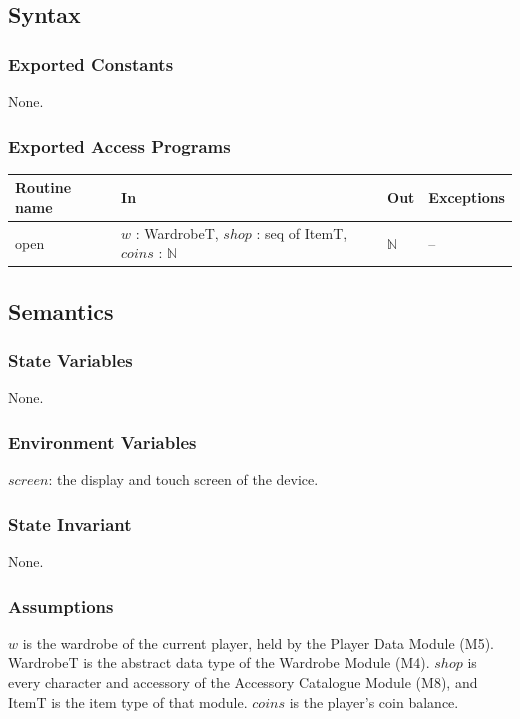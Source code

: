 \documentclass[10pt, titlepage]{article}
\newcommand{\N}{\mathbb{N}}
\newcommand{\T}[1]{\mathit{#1}}          %
\newenvironment{accessprogs}{%
  \begin{center}\small
  \begin{tabular}{>{\raggedright\arraybackslash}p{3.0cm}
    >{\raggedright\arraybackslash}p{5.0cm}
    >{\raggedright\arraybackslash}p{2.8cm}
    >{\raggedright\arraybackslash}p{3.4cm}}
  \toprule
  \textbf{Routine name} & \textbf{In} & \textbf{Out} & \textbf{Exceptions}\\
  \midrule}{%
  \bottomrule
  \end{tabular}
  \end{center}}
\begin{document}
\subsection{Syntax}

\subsubsection{Exported Constants}

None.

\subsubsection{Exported Access Programs}

\begin{accessprogs}
open & $w$ : WardrobeT, $\T{shop}$ : seq of ItemT, $\T{coins}$ : $\N$ & $\N$ & --\\
\end{accessprogs}

\subsection{Semantics}

\subsubsection{State Variables}

None.

\subsubsection{Environment Variables}

$\T{screen}$: the display and touch screen of the device.

\subsubsection{State Invariant}

None.

\subsubsection{Assumptions}

$w$ is the wardrobe of the current player, held by the Player Data Module (M5).
WardrobeT is the abstract data type of the Wardrobe Module (M4).
$\T{shop}$ is every character and accessory of the Accessory Catalogue Module
(M8), and ItemT is the item type of that module. $\T{coins}$ is the player's
coin balance.
\end{document}
